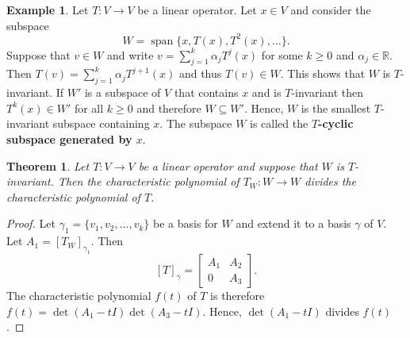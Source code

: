 \documentclass[12pt]{article}
\DeclareMathOperator{\spn}{span}
\newcommand{\real}{\mathbb{R}}
\newtheorem{theorem}{Theorem}[section]
\theoremstyle{definition}
\newtheorem{example}{Example}[section]
\begin{document}
\begin{example}
Let $T:V\rightarrow V$ be a linear operator.  Let $x\in V$ and consider the subspace
\[
W = \spn\{x,T(x),T^2(x),\ldots\}.
\]
Suppose that $v\in W$ and write $v=\sum_{j=1}^k \alpha_j T^j(x)$ for some $k\geq 0$ and $\alpha_j\in\real$.  Then $T(v) = \sum_{j=1}^k \alpha_j T^{j+1}(x)$ and thus $T(v) \in W$.  This shows that $W$ is $T$-invariant.  If $W'$ is a subspace of $V$ that contains $x$ and is $T$-invariant then $T^k(x)\in W'$ for all $k\geq 0$ and therefore $W\subseteq W'$.  Hence, $W$ is the smallest $T$-invariant subspace containing $x$.  The subspace $W$ is called the \textbf{$T$-cyclic subspace generated by $x$}.
\end{example}

\begin{theorem}
Let $T:V\rightarrow V$ be a linear operator and suppose that $W$ is $T$-invariant.  Then the characteristic polynomial of $T_W:W\rightarrow W$ divides the characteristic polynomial of $T$.
\end{theorem}
\begin{proof}
Let $\gamma_1=\{v_1,v_2,\ldots,v_k\}$ be a basis for $W$ and extend it to a basis $\gamma$ of $V$.  Let $A_1=[T_W]_{\gamma_1}$.  Then 
\[
[T]_\gamma = \begin{bmatrix} A_1 & A_2\\ 0 & A_3\end{bmatrix}.
\]
The characteristic polynomial $f(t)$ of $T$ is therefore $f(t) = \det(A_1-tI) \det(A_3-tI)$.  Hence, $\det(A_1-tI)$ divides $f(t)$.
\end{proof}
\end{document}
